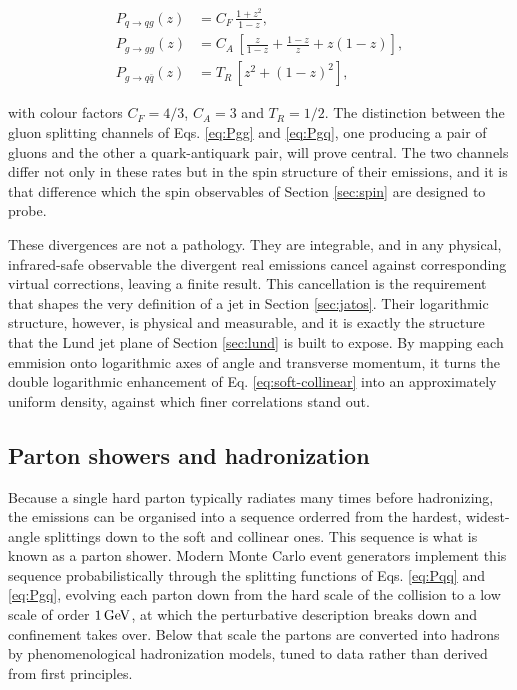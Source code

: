 \begin{align}
  P_{q \to qg}(z) &= C_F\,\frac{1 + z^2}{1 - z}, \label{eq:Pqq}\\[4pt]
  P_{g \to gg}(z) &= C_A\,
    \left[ \frac{z}{1-z} + \frac{1-z}{z} + z(1-z) \right], \label{eq:Pgg}\\[4pt]
  P_{g \to q\bar{q}}(z) &= T_R\,\left[ z^2 + (1-z)^2 \right], \label{eq:Pgq}
\end{align}

with colour factors $C_F = 4/3$, $C_A = 3$ and $T_R = 1/2$. The distinction
between the gluon splitting channels of Eqs. \eqref{eq:Pgg} and \eqref{eq:Pgq},
one producing a pair of gluons and the other a quark-antiquark pair, will
prove central. The two channels differ not only in these rates but in the spin
structure of their emissions, and it is that difference which the spin
observables of Section \ref{sec:spin} are designed to probe.

These divergences are not a pathology. They are integrable, and in any physical,
infrared-safe observable the divergent real emissions cancel against
corresponding virtual corrections, leaving a finite result. This cancellation
is the requirement that shapes the very definition of a jet in Section \ref{sec:jatos}.
Their logarithmic structure, however, is physical and measurable, and it is exactly
the structure that the Lund jet plane of Section \ref{sec:lund} is built to expose.
By mapping each emmision onto logarithmic axes of angle and transverse momentum,
it turns the double logarithmic enhancement of Eq. \eqref{eq:soft-collinear}
into an approximately uniform density, against which finer correlations stand out.

\subsection{Parton showers and hadronization}

Because a single hard parton typically radiates many times before hadronizing,
the emissions can be organised into a sequence orderred from the hardest,
widest-angle splittings down to the soft and collinear ones. This sequence
is what is known as a parton shower. Modern Monte Carlo event generators implement
this sequence probabilistically through the splitting functions of Eqs. 
\eqref{eq:Pqq} and \eqref{eq:Pgq}, evolving each parton down from the hard 
scale of the collision to a low scale of order $1\,\mathrm{GeV}$, at which the perturbative
description breaks down and confinement takes over. Below that scale the partons
are converted into hadrons by phenomenological hadronization models, tuned to data
rather than derived from first principles.

